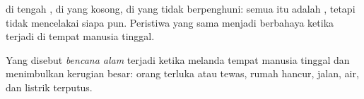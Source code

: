  di tengah ,  di  yang kosong,  di 
yang tidak berpenghuni: semua itu adalah , tetapi tidak
mencelakai siapa pun. Peristiwa yang sama menjadi berbahaya ketika terjadi
di tempat manusia tinggal.

\begin{definition}\label{def:g5:natural-hazards:disaster}
Yang disebut \emph{bencana alam} terjadi ketika  melanda tempat manusia tinggal dan menimbulkan kerugian besar: orang
terluka atau tewas, rumah hancur, jalan, air, dan listrik terputus.
\end{definition}


